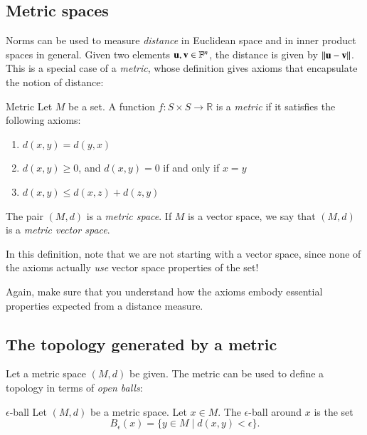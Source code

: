 \subsection{Metric spaces}
\label{sec:metric-defintion}


Norms can be used to measure \emph{distance} in Euclidean space and in inner product spaces in general. Given two elements $\mathbf{u},\mathbf{v}\in\mathbb{F}^n$, the distance is given by $\|\mathbf{u}-\mathbf{v}\|$. This is a special case of a \emph{metric}, whose definition gives axioms that encapsulate the notion of distance:
\begin{myDefinition}{Metric}{}
    Let $M$ be a set. A function $f: S\times S \to \mathbb{R}$ is a \emph{metric} if it satisfies the following axioms:
    \begin{enumerate}
        \item $d(x,y) = d(y,x)$ 
        \item $d(x,y) \geq 0$, and $d(x,y) = 0$ if and only if $x =y$ 
        \item $d(x,y) \leq d(x,z) + d(z,y)$ 
    \end{enumerate}
    The pair $(M,d)$ is a \emph{metric space}. If $M$ is a vector space, we say that $(M,d)$ is a \emph{metric vector space}.
\end{myDefinition}
In this definition, note that we are not starting with a vector space, since none of the axioms actually \emph{use} vector space properties of the set!

Again, make sure that you understand how the axioms embody essential properties expected from a distance measure.

\subsection{The topology generated by a metric}
\label{sec:topology from metric}

Let a metric space $(M,d)$ be given. The metric can be used to define a topology in terms of \emph{open balls}:

\begin{myDefinition}{$\epsilon$-ball}{}
    Let $(M,d)$ be a metric space.
    Let $x \in M$.
    The $\epsilon$-ball around $x$ is the set
    \begin{equation}
        B_\epsilon(x) = \{ y \in M \mid d(x,y) < \epsilon  \}.
    \end{equation}
\end{myDefinition}

